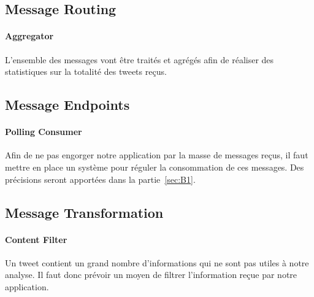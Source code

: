   \subsection{Message Routing}
    \paragraph{Aggregator} L'ensemble des messages vont être traités et agrégés afin de réaliser des statistiques sur la totalité des tweets reçus.

  \subsection{Message Endpoints}
    \paragraph{Polling Consumer} Afin de ne pas engorger notre application par la masse de messages reçus, il faut mettre en place un système pour réguler la consommation de ces messages. Des précisions seront apportées dans la partie~\ref{sec:B1}.

  \subsection{Message Transformation}
    \paragraph{Content Filter} Un tweet contient un grand nombre d'informations qui ne sont pas utiles à notre analyse. Il faut donc prévoir un moyen de filtrer l'information reçue par notre application.
